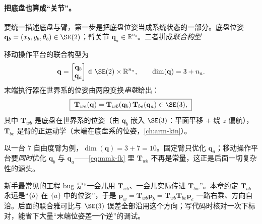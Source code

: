 \paragraph{把底盘也算成“关节”。}
要统一描述底盘与臂，第一步是把底盘位姿当成系统状态的一部分。底盘位姿 $\mathbf{q}_b=(x_b,y_b,\theta_b)\in\SE(2)$；臂关节 $\mathbf{q}_a\in\mathbb{R}^{n_a}$。二者拼成\emph{联合构型}

\begin{definition}[移动操作的联合构型空间]\label{def:mmk-config}
移动操作平台的联合构型为
\begin{equation}
  \mathbf{q}=\begin{bmatrix}\mathbf{q}_b\\\mathbf{q}_a\end{bmatrix}\in\SE(2)\times\mathbb{R}^{n_a},\qquad
  \dim(\mathbf{q})=3+n_a.
  \label{eq:mmk-config}
\end{equation}
末端执行器在世界系的位姿由两段变换\emph{串联}给出：
\begin{equation}
  \boxed{\;\mathbf{T}_{we}(\mathbf{q})=\mathbf{T}_{wb}(\mathbf{q}_b)\,\mathbf{T}_{be}(\mathbf{q}_a)\in\SE(3),\;}
  \label{eq:mmk-fk}
\end{equation}
其中 $\mathbf{T}_{wb}$ 是底盘在世界系的位姿（由 $\mathbf{q}_b$ 嵌入 $\SE(3)$：平面平移 $+$ 绕 $z$ 偏航），$\mathbf{T}_{be}$ 是臂的正运动学（末端在底盘系的位姿，\cref{ch:arm-kin}）。
\end{definition}

以一台 $7$ 自由度臂为例，$\dim(\mathbf{q})=3+7=10$。固定臂只优化 $\mathbf{q}_a$；移动操作平台要\emph{同时}优化 $\mathbf{q}_b$ 与 $\mathbf{q}_a$——\cref{eq:mmk-fk} 里 $\mathbf{T}_{wb}$ 不再是常量，这正是后面一切复杂性的源头。

\begin{pitfall}
新手最常见的工程 bug 是“一会儿用 $\mathbf{T}_{wb}$、一会儿实际传进 $\mathbf{T}_{bw}$”。本章约定 $\mathbf{T}_{ab}$ 永远是“$\{b\}$ 在 $\{a\}$ 中的位姿”，于是 $\mathbf{p}_w=\mathbf{T}_{wb}\mathbf{p}_b=\mathbf{T}_{wb}\mathbf{T}_{be}\mathbf{p}_e$ 一路右乘、方向自洽。后面的联合雅可比与 $\SE(3)$ 误差全部沿用这个方向；写代码时核对一次下标对，能省下大量“末端位姿差一个逆”的调试。
\end{pitfall}

